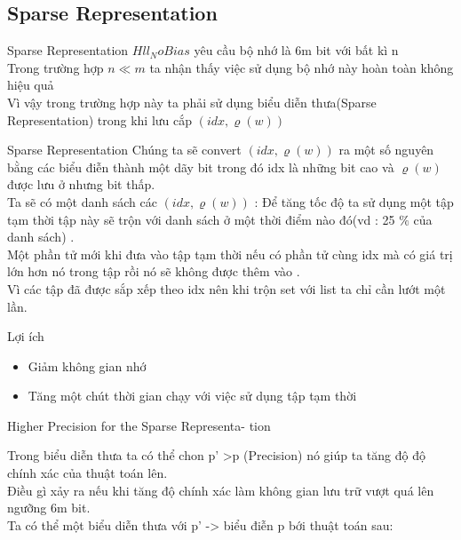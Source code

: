 \documentclass{beamer}
\begin{document}
\subsection{Sparse Representation}
\begin{frame}{Sparse Representation}
$Hll_NoBias $ yêu cầu bộ nhớ là 6m bit với bất kì n  \\
Trong trường hợp $n\ll m $ ta nhận thấy việc sử dụng bộ nhớ này hoàn toàn không hiệu quả \\
Vì vậy trong trường hợp này ta  phải sử dụng biểu diễn thưa(Sparse Representation) trong khi lưu cắp $(idx,\varrho(w)) $ \\
\end{frame}
\begin{frame}{Sparse Representation}
Chúng ta sẽ convert $(idx,\varrho(w)) $ ra một số nguyên bằng các biểu điễn thành một dãy bit trong đó idx là những bit cao và $\varrho(w) $ được lưu ở nhưng bit thấp. \\
Ta sẽ có một danh sách các $(idx,\varrho(w)) $ :
Để tăng tốc độ ta sử dụng một tập tạm thời tập này sẽ trộn với danh sách ở một thời điểm nào đó(vd : 25 $\%$ của danh sách) .\\
Một phần tử mới khi đưa vào  tập tạm thời nếu có phần tử cùng idx mà có giá trị lớn hơn nó trong tập rồi nó sẽ không được thêm vào .\\
Vì các tập đã được sắp xếp theo idx nên khi trộn set với list ta chỉ cần lướt một lần.

\end{frame}
\begin{frame}{Lợi ích }
\begin{itemize}
\item Giảm không gian nhớ
\item Tăng một chút thời gian chạy với việc sử dụng tập tạm thời
\end{itemize}
\end{frame}
\begin{frame}{Higher Precision for the Sparse Representa-
tion} 

Trong biểu diễn thưa ta có thể chon p' >p (Precision) nó giúp ta tăng độ  độ chính xác của thuật toán lên.\\

Điều gì xảy ra nếu khi tăng độ chính xác làm không gian lưu trữ vượt quá lên ngưỡng 6m bit.\\
Ta có thể một biểu diễn thưa với p' -> biểu điễn p bới thuật toán sau:

\end{frame}
\end{document}
